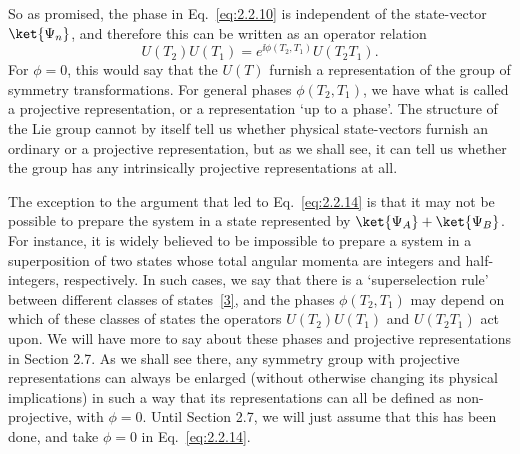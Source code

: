 So as promised, the phase in Eq.~\eqref{eq:2.2.10} is independent of the
state-vector $\ket{\Psi_n}$, and therefore this can be written as an operator
relation
\begin{equation}
  U(T_2)U(T_1)=e^{\ii\phi(T_2,T_1)}U(T_2T_1).
  \tag{2.2.14}\label{eq:2.2.14}
\end{equation}
For $\phi=0$, this would say that the $U(T)$ furnish a representation of
the group of symmetry transformations. For general phases $\phi(T_2,T_1)$,
we have what is called a projective representation, or a representation
`up to a phase'. The structure of the Lie group cannot by itself tell us
whether physical state-vectors furnish an ordinary or a projective
representation, but as we shall see, it can tell us whether the group has
any intrinsically projective representations at all.

The exception to the argument that led to Eq.~\eqref{eq:2.2.14} is that it may
not be possible to prepare the system in a state represented by
$\ket{\Psi_A}+\ket{\Psi_B}$. For instance, it is widely believed to be
impossible to prepare a system in a superposition of two states whose total
angular momenta are integers and half-integers, respectively. In such
cases, we say that there is a `superselection rule' between different
classes of states~\hyperref[ref:2.3]{[3]}, and the phases $\phi(T_2,T_1)$ may
depend on which of these classes of states the operators $U(T_2)U(T_1)$
and $U(T_2T_1)$ act upon. We will have more to say about these phases and
projective representations in Section 2.7. As we shall see there, any
symmetry group with projective representations can always be enlarged
(without otherwise changing its physical implications) in such a way that
its representations can all be defined as non-projective, with $\phi=0$.
Until Section 2.7, we will just assume that this has been done, and take
$\phi=0$ in Eq.~\eqref{eq:2.2.14}.

